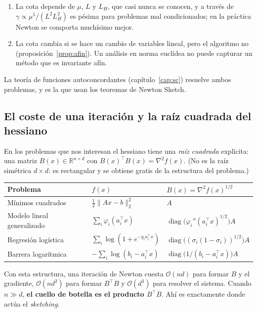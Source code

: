 \documentclass[11pt,a4paper,oneside]{book}
\theoremstyle{definition}
\theoremstyle{remark}
\newcommand{\R}{\mathbb{R}}
\newcommand{\cO}{\mathcal{O}}
\newcommand{\T}{^{\top}}
\newcommand{\nrm}[1]{\lVert #1\rVert}
\DeclareMathOperator{\diag}{diag}
\newcommand{\LH}{L_{H}}
\begin{document}
\begin{cuidado}
\begin{enumerate}
  \item La cota depende de $\mu$, $L$ y $\LH$, que casi nunca se conocen, y a través de $\gamma\propto\mu^5/(L^2\LH^2)$
        es pésima para problemas mal condicionados; en la práctica Newton se comporta muchísimo mejor.
  \item La cota cambia si se hace un cambio de variables lineal, pero el algoritmo no (proposición~\ref{prop:afin}).
        Un análisis en norma euclídea no puede capturar un método que es invariante afín.
\end{enumerate}
La teoría de funciones autoconcordantes (capítulo~\ref{cap:sc}) resuelve ambos problemas, y es la que usan
los teoremas de Newton Sketch.
\end{cuidado}

\subsection{El coste de una iteración y la raíz cuadrada del hessiano}\label{sec:raiz-hess}

En los problemas que nos interesan el hessiano tiene una \emph{raíz cuadrada} explícita:
una matriz $B(x)\in\R^{n\times d}$ con $B(x)\T B(x)=\nabla^2 f(x)$. (No es la raíz simétrica $d\times d$: es
rectangular y se obtiene gratis de la estructura del problema.)

\begin{center}
\small
\begin{tabular}{@{}lll@{}}
\toprule
Problema & $f(x)$ & $B(x)=\nabla^2 f(x)^{1/2}$ \\
\midrule
Mínimos cuadrados & $\tfrac12\nrm{Ax-b}_2^2$ & $A$ \\
Modelo lineal generalizado & $\sum_i\varphi_i(a_i\T x)$ & $\diag\bigl(\varphi_i''(a_i\T x)^{1/2}\bigr)A$ \\
Regresión logística & $\sum_i\log(1+e^{-y_ia_i\T x})$ & $\diag\bigl((\sigma_i(1-\sigma_i))^{1/2}\bigr)A$ \\
Barrera logarítmica & $-\sum_i\log(b_i-a_i\T x)$ & $\diag\bigl(1/(b_i-a_i\T x)\bigr)A$ \\
\bottomrule
\end{tabular}
\end{center}

Con esta estructura, una iteración de Newton cuesta $\cO(nd)$ para formar $B$ y el gradiente,
$\cO(nd^2)$ para formar $B\T B$ y $\cO(d^3)$ para resolver el sistema. Cuando $n\gg d$, \textbf{el cuello de
botella es el producto $B\T B$}. Ahí es exactamente donde actúa el \emph{sketching}.
\end{document}
